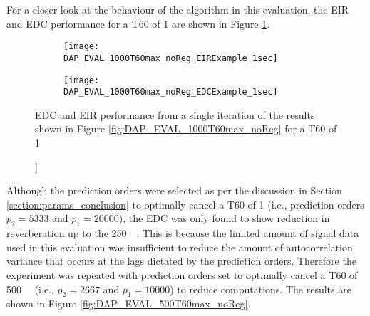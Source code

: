For a closer look at the behaviour of the algorithm in this evaluation, the EIR and EDC performance for a T60 of \qty{1}{\sec} are shown in Figure \ref{fig:DAP_EVAL_1000T60max_noReg_EDCExample}. 

\begin{figure}[H]
	\centering
	\begin{subfigure}[b]{0.42\textwidth}
		\centering
		\texttt{[image: DAP\_EVAL\_1000T60max\_noReg\_EIRExample\_1sec]}
	\end{subfigure}
	\begin{subfigure}[b]{0.45\textwidth}
		\centering
		\texttt{[image: DAP\_EVAL\_1000T60max\_noReg\_EDCExample\_1sec]}
	\end{subfigure}
		\caption[EDC example from DAP Evaluation with $p_2=5333$]]{EDC and EIR performance from a single iteration of the results shown in Figure \ref{fig:DAP_EVAL_1000T60max_noReg} for a T60 of \qty{1}{\sec}}
	\label{fig:DAP_EVAL_1000T60max_noReg_EDCExample}
\end{figure}

Although the prediction orders were selected as per the discussion in Section \ref{section:params_conclusion} to optimally cancel a T60 of \qty{1}{\sec} (i.e., prediction orders $p_2=5333$ and $p_1=20000$), the EDC was only found to show reduction in reverberation up to the \qty{250}{\milli\sec}. This is because the limited amount of signal data used in this evaluation was insufficient to reduce the amount of autocorrelation variance that occurs at the lags dictated by the prediction orders. Therefore the experiment was repeated with prediction orders set to optimally cancel a T60 of \qty{500}{\milli\sec} (i.e., $p_2=2667$ and $p_1=10000$) to reduce computations. The results are shown in Figure \ref{fig:DAP_EVAL_500T60max_noReg}.


